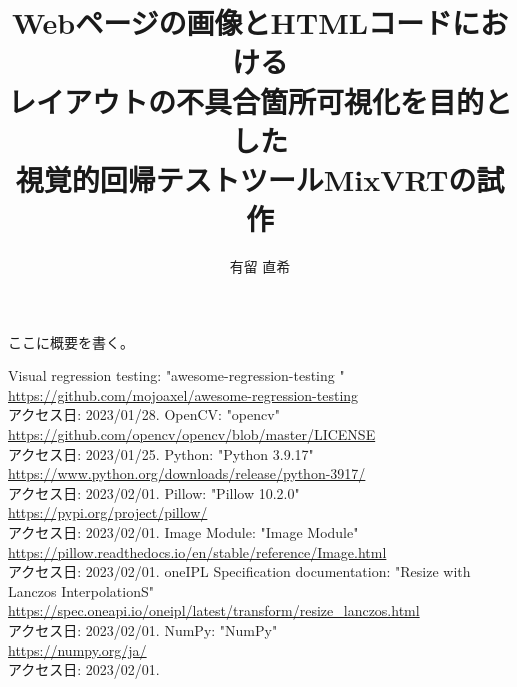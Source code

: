 \documentclass[uplatex, report, a4j, 10pt]{jsbook}
\title{Webページの画像とHTMLコードにおける\\レイアウトの不具合箇所可視化を目的とした\\視覚的回帰テストツールMixVRTの試作}
\author{有留 直希}
\begin{document}
\maketitle

%
% 
ここに概要を書く。


%
% 








%


%
\begin{thebibliography}{0}
    Visual regression testing: "awesome-regression-testing
    "\\\url{https://github.com/mojoaxel/awesome-regression-testing}\\アクセス日: 2023/01/28.
    OpenCV: "opencv"\\\url{https://github.com/opencv/opencv/blob/master/LICENSE}\\アクセス日: 2023/01/25.
    Python: "Python 3.9.17"\\\url{https://www.python.org/downloads/release/python-3917/}\\アクセス日: 2023/02/01.
    Pillow: "Pillow 10.2.0"\\\url{https://pypi.org/project/pillow/}\\アクセス日: 2023/02/01.
    Image Module: "Image Module"\\\url{https://pillow.readthedocs.io/en/stable/reference/Image.html}\\アクセス日: 2023/02/01.
    oneIPL Specification documentation: "Resize with Lanczos InterpolationS"\\\url{https://spec.oneapi.io/oneipl/latest/transform/resize_lanczos.html}\\アクセス日: 2023/02/01.
    NumPy: "NumPy"\\\url{https://numpy.org/ja/}\\アクセス日: 2023/02/01.
    
    

\end{thebibliography}
\end{document}
